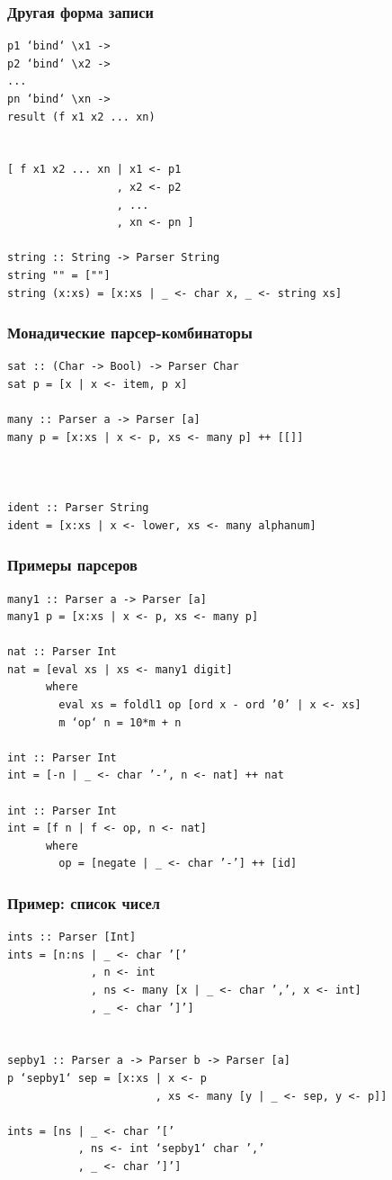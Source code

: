 \documentclass{beamer}
\begin{document}
\begin{frame}[fragile]
  \transwipe[direction=90]
  \frametitle{Другая форма записи}
\begin{verbatim}
p1 ‘bind‘ \x1 ->
p2 ‘bind‘ \x2 ->
...
pn ‘bind‘ \xn ->
result (f x1 x2 ... xn)


[ f x1 x2 ... xn | x1 <- p1
                 , x2 <- p2
                 , ...
                 , xn <- pn ]

string :: String -> Parser String
string "" = [""]
string (x:xs) = [x:xs | _ <- char x, _ <- string xs]
\end{verbatim}
\end{frame}

\begin{frame}[fragile]
  \transwipe[direction=90]
  \frametitle{Монадические парсер-комбинаторы}
\begin{verbatim}
sat :: (Char -> Bool) -> Parser Char
sat p = [x | x <- item, p x]

many :: Parser a -> Parser [a]
many p = [x:xs | x <- p, xs <- many p] ++ [[]]



ident :: Parser String
ident = [x:xs | x <- lower, xs <- many alphanum]
\end{verbatim}
\end{frame}

\begin{frame}[fragile]
  \transwipe[direction=90]
  \frametitle{Примеры парсеров}
\begin{verbatim}
many1 :: Parser a -> Parser [a]
many1 p = [x:xs | x <- p, xs <- many p]

nat :: Parser Int
nat = [eval xs | xs <- many1 digit]
      where
        eval xs = foldl1 op [ord x - ord ’0’ | x <- xs]
        m ‘op‘ n = 10*m + n

int :: Parser Int
int = [-n | _ <- char ’-’, n <- nat] ++ nat

int :: Parser Int
int = [f n | f <- op, n <- nat]
      where
        op = [negate | _ <- char ’-’] ++ [id]
\end{verbatim}
\end{frame}


\begin{frame}[fragile]
  \transwipe[direction=90]
  \frametitle{Пример: список чисел}
\begin{verbatim}
ints :: Parser [Int]
ints = [n:ns | _ <- char ’[’
             , n <- int
             , ns <- many [x | _ <- char ’,’, x <- int]
             , _ <- char ’]’]


sepby1 :: Parser a -> Parser b -> Parser [a]
p ‘sepby1‘ sep = [x:xs | x <- p
                       , xs <- many [y | _ <- sep, y <- p]]

ints = [ns | _ <- char ’[’
           , ns <- int ‘sepby1‘ char ’,’
           , _ <- char ’]’]

\end{verbatim}
\end{frame}
\end{document}
